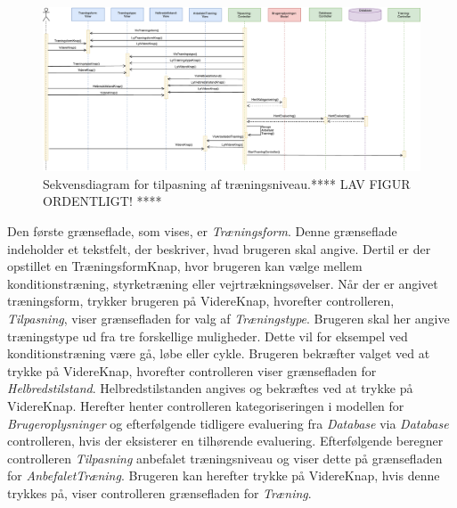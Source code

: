 \begin{figure} [H]
\centering
\includegraphics[width=1.55\textwidth, angle=90]{figures/Sek/SEKTilpasning}
\caption{Sekvensdiagram for tilpasning af træningsniveau.**** LAV FIGUR ORDENTLIGT! ****}
\label{fig:SEKTilpasning}
\end{figure}

\noindent
Den første grænseflade, som vises, er \textit{Træningsform}. Denne grænseflade indeholder et tekstfelt, der beskriver, hvad brugeren skal angive. Dertil er der opstillet en TræningsformKnap, hvor brugeren kan vælge mellem konditionstræning, styrketræning eller vejrtrækningsøvelser. Når der er angivet træningsform, trykker brugeren på VidereKnap, hvorefter controlleren, \textit{Tilpasning}, viser grænsefladen for valg af \textit{Træningstype}. Brugeren skal her angive træningstype ud fra tre forskellige muligheder. Dette vil for eksempel ved konditionstræning være gå, løbe eller cykle. Brugeren bekræfter valget ved at trykke på VidereKnap, hvorefter controlleren viser grænsefladen for \textit{Helbredstilstand}. Helbredstilstanden angives og bekræftes ved at trykke på VidereKnap. Herefter henter controlleren kategoriseringen i modellen for \textit{Brugeroplysninger} og efterfølgende tidligere evaluering fra \textit{Database} via \textit{Database} controlleren, hvis der eksisterer en tilhørende evaluering.
Efterfølgende beregner controlleren \textit{Tilpasning} anbefalet træningsniveau og viser dette på grænsefladen for \textit{AnbefaletTræning}. Brugeren kan herefter trykke på VidereKnap, hvis denne trykkes på, viser controlleren grænsefladen for \textit{Træning}. 
